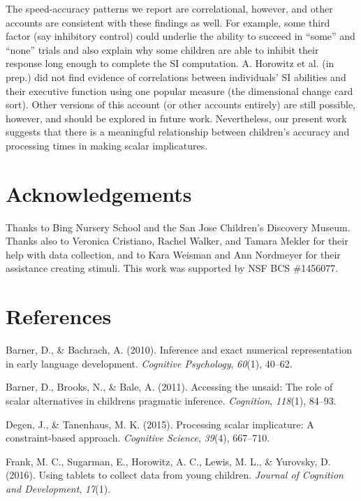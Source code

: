 \documentclass[10pt, letterpaper]{article}
\begin{document}
The speed-accuracy patterns we report are correlational, however, and
other accounts are consistent with these findings as well. For example,
some third factor (say inhibitory control) could underlie the ability to
succeed in ``some'' and ``none'' trials and also explain why some
children are able to inhibit their response long enough to complete the
SI computation. A. Horowitz et al. (in prep.) did not find evidence of
correlations between individuals' SI abilities and their executive
function using one popular measure (the dimensional change card sort).
Other versions of this account (or other accounts entirely) are still
possible, however, and should be explored in future work. Nevertheless,
our present work suggests that there is a meaningful relationship
between children's accuracy and processing times in making scalar
implicatures.

\section{Acknowledgements}\label{acknowledgements}

Thanks to Bing Nursery School and the San Jose Children's Discovery
Museum. Thanks also to Veronica Cristiano, Rachel Walker, and Tamara
Mekler for their help with data collection, and to Kara Weisman and Ann
Nordmeyer for their assistance creating stimuli. This work was supported
by NSF BCS \#1456077.

\section{References}\label{references}

\setlength{\parindent}{-0.1in} \setlength{\leftskip}{0.125in} \noindent

Barner, D., \& Bachrach, A. (2010). Inference and exact numerical
representation in early language development. \emph{Cognitive
Psychology}, \emph{60}(1), 40--62.

Barner, D., Brooks, N., \& Bale, A. (2011). Accessing the unsaid: The
role of scalar alternatives in childrens pragmatic inference.
\emph{Cognition}, \emph{118}(1), 84--93.

Degen, J., \& Tanenhaus, M. K. (2015). Processing scalar implicature: A
constraint-based approach. \emph{Cognitive Science}, \emph{39}(4),
667--710.

Frank, M. C., Sugarman, E., Horowitz, A. C., Lewis, M. L., \& Yurovsky,
D. (2016). Using tablets to collect data from young children.
\emph{Journal of Cognition and Development}, \emph{17}(1).
\end{document}
